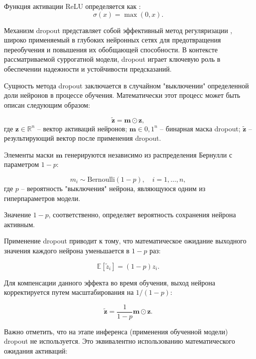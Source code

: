 Функция активации ReLU определяется как \cite*{nair2010rectified}:
\begin{equation}
    \sigma(x) = \max(0, x).
\end{equation}

Механизм dropout представляет собой эффективный метод регуляризации \cite*{srivastava2014dropout},
широко применяемый в глубоких нейронных сетях для предотвращения переобучения
и повышения их обобщающей способности. В контексте рассматриваемой суррогатной
модели, dropout играет ключевую роль в обеспечении надежности
и устойчивости предсказаний.

Сущность метода dropout заключается в случайном "выключении" определенной
доли нейронов в процессе обучения. Математически этот процесс может быть описан
следующим образом:

\begin{equation}
    \tilde{\mathbf{z}} = \mathbf{m} \odot \mathbf{z},
\end{equation}
где $\mathbf{z} \in \mathbb{R}^n$ -- вектор активаций нейронов;
$\mathbf{m} \in {0, 1}^n$ -- бинарная маска dropout;
$\tilde{\mathbf{z}}$ -- результирующий вектор после применения dropout.

Элементы маски $\mathbf{m}$ генерируются независимо из распределения Бернулли с параметром $1-p$:

\begin{equation}
    m_i \sim \text{Bernoulli}(1-p), \quad i = 1, \ldots, n,
\end{equation}
где $p$ -- вероятность "выключения" нейрона, являющуюся одним из гиперпараметров модели.

Значение $1-p$, соответственно, определяет вероятность сохранения нейрона активным.

Применение dropout приводит к тому, что математическое
ожидание выходного значения каждого нейрона уменьшается в $1-p$ раз:

\begin{equation}
    \mathbb{E}[\tilde{z}_i] = (1-p)z_i.
\end{equation}

Для компенсации данного эффекта во время обучения, выход нейрона
корректируется путем масштабирования на $1/(1-p)$:

\begin{equation}
    \tilde{\mathbf{z}} = \frac{1}{1-p}\mathbf{m} \odot \mathbf{z}.
\end{equation}

Важно отметить, что на этапе инференса (применения обученной модели)
dropout не используется. Это эквивалентно использованию математического ожидания активаций:

